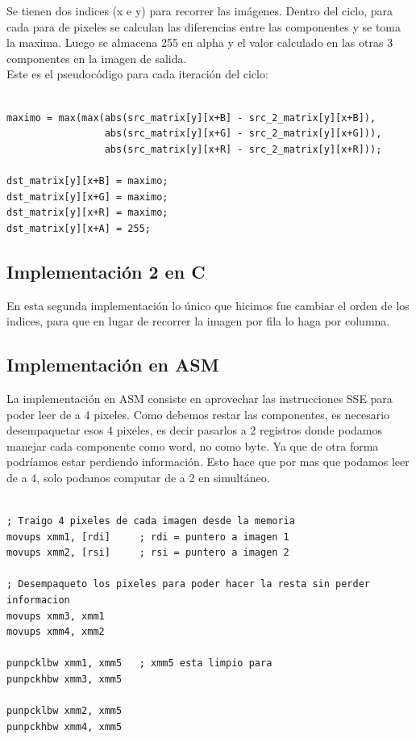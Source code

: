 \documentclass[10pt,a4paper,spanish]{article}
\begin{document}
Se tienen dos indices (x e y) para recorrer las imágenes. Dentro del ciclo, para cada para de pixeles se calculan las diferencias entre las componentes y se toma la maxima. Luego se almacena 255 en alpha y el valor calculado en las otras 3 componentes en la imagen de salida. \\

Este es el pseudocódigo para cada iteración del ciclo:

\begin{codesnippet}
\begin{verbatim}

maximo = max(max(abs(src_matrix[y][x+B] - src_2_matrix[y][x+B]),
                 abs(src_matrix[y][x+G] - src_2_matrix[y][x+G])),
                 abs(src_matrix[y][x+R] - src_2_matrix[y][x+R]));

dst_matrix[y][x+B] = maximo;
dst_matrix[y][x+G] = maximo;
dst_matrix[y][x+R] = maximo;
dst_matrix[y][x+A] = 255;

\end{verbatim}
\end{codesnippet}

\subsection{Implementación 2 en C}

En esta segunda implementación lo único que hicimos fue cambiar el orden de los indices, para que en lugar de recorrer la imagen por fila lo haga por columna.

\subsection{Implementación en ASM}

La implementación en ASM consiste en aprovechar las instrucciones SSE para poder leer de a 4 pixeles. Como debemos restar las componentes, es necesario desempaquetar esos 4 pixeles, es decir pasarlos a 2 registros donde podamos manejar cada componente como word, no como byte. Ya que de otra forma podríamos estar perdiendo información. Esto hace que por mas que podamos leer de a 4, solo podamos computar de a 2 en simultáneo.

\begin{codesnippet}
\begin{verbatim}

; Traigo 4 pixeles de cada imagen desde la memoria
movups xmm1, [rdi]     ; rdi = puntero a imagen 1
movups xmm2, [rsi]     ; rsi = puntero a imagen 2

; Desempaqueto los pixeles para poder hacer la resta sin perder informacion
movups xmm3, xmm1
movups xmm4, xmm2

punpcklbw xmm1, xmm5   ; xmm5 esta limpio para
punpckhbw xmm3, xmm5

punpcklbw xmm2, xmm5
punpckhbw xmm4, xmm5

\end{verbatim}
\end{codesnippet}
\end{document}
